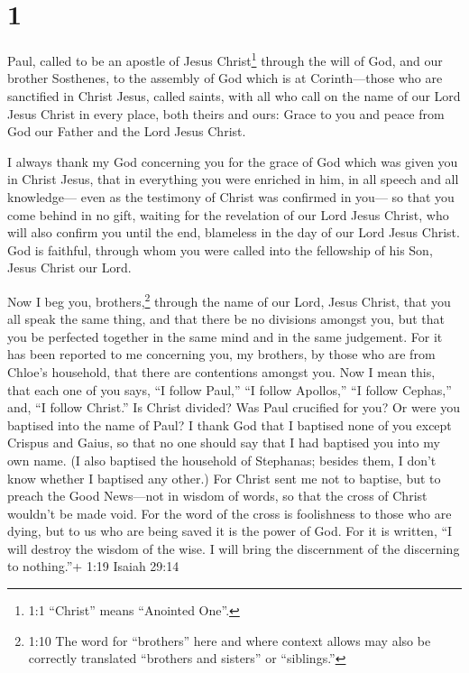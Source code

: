 \hypertarget{section}{%
\section{1}\label{section}}

 Paul, called to be an apostle of Jesus Christ\footnote{1:1
  ``Christ'' means ``Anointed One''.} through the will of God, and our
brother Sosthenes,  to the assembly of God which is at
Corinth---those who are sanctified in Christ Jesus, called saints, with
all who call on the name of our Lord Jesus Christ in every place, both
theirs and ours:  Grace to you and peace from God our Father
and the Lord Jesus Christ.

 I always thank my God concerning you for the grace of God
which was given you in Christ Jesus,  that in everything you
were enriched in him, in all speech and all knowledge--- 
even as the testimony of Christ was confirmed in you---  so
that you come behind in no gift, waiting for the revelation of our Lord
Jesus Christ,  who will also confirm you until the end,
blameless in the day of our Lord Jesus Christ.  God is
faithful, through whom you were called into the fellowship of his Son,
Jesus Christ our Lord.

 Now I beg you, brothers,\footnote{1:10 The word for
  ``brothers'' here and where context allows may also be correctly
  translated ``brothers and sisters'' or ``siblings.''} through the name
of our Lord, Jesus Christ, that you all speak the same thing, and that
there be no divisions amongst you, but that you be perfected together in
the same mind and in the same judgement.  For it has been
reported to me concerning you, my brothers, by those who are from
Chloe's household, that there are contentions amongst you. 
Now I mean this, that each one of you says, ``I follow Paul,'' ``I
follow Apollos,'' ``I follow Cephas,'' and, ``I follow Christ.''
 Is Christ divided? Was Paul crucified for you? Or were you
baptised into the name of Paul?  I thank God that I
baptised none of you except Crispus and Gaius,  so that no
one should say that I had baptised you into my own name. 
(I also baptised the household of Stephanas; besides them, I don't know
whether I baptised any other.)  For Christ sent me not to
baptise, but to preach the Good News---not in wisdom of words, so that
the cross of Christ wouldn't be made void.  For the word of
the cross is foolishness to those who are dying, but to us who are being
saved it is the power of God.  For it is written, ``I will
destroy the wisdom of the wise. I will bring the discernment of the
discerning to nothing.''+ 1:19 Isaiah 29:14

